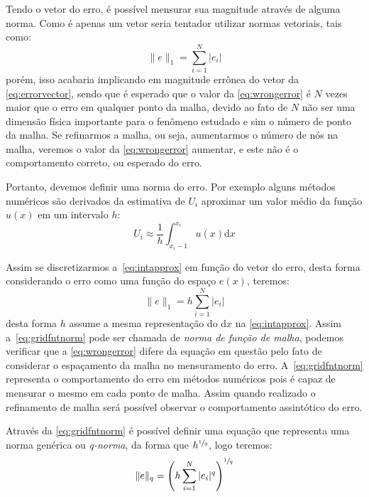 \documentclass[
	12pt,				  %
	openright,		%
	twoside,			%
	a4paper,			%
	chapter=TITLE,		    %
	english,			%
	brazil				%
	]{abntex2}
\begin{document}
Tendo o vetor do erro, é possível mensurar sua magnitude através
de alguma norma. Como é apenas um vetor seria tentador utilizar normas
vetoriais, tais como:
\begin{equation}
    \|e\|_1 = \sum_{i=1}^N |e_i|
    \label{eq:wrongerror}
\end{equation}
porém, isso acabaria implicando em magnitude errônea do vetor da
\autoref{eq:errorvector}, sendo que é esperado que o valor da
\autoref{eq:wrongerror} é $N$ vezes maior que o erro em qualquer ponto da
malha, devido ao fato de $N$ não ser uma dimensão física importante para o
fenômeno estudado e sim o número de ponto da malha. Se refinarmos a malha, ou
seja, aumentarmos o número de nós na malha, veremos o valor da
\autoref{eq:wrongerror} aumentar, e este não é o comportamento correto, ou
esperado do erro. 

Portanto, devemos definir uma norma do erro. Por exemplo alguns métodos
numéricos são derivados da estimativa de $U_i$ aproximar um valor médio da função
$u(x)$ em um intervalo $h$:
\begin{equation}
    U_i \approx \frac{1}{h}\int_{x_i-1}^{x_i} u(x)\mathrm{d}x
    \label{eq:intapprox}
\end{equation}

Assim se discretizarmos a~\autoref{eq:intapprox} em função do vetor do erro,
desta forma considerando o erro como uma função do espaço $e(x)$, teremos:
\begin{equation}
    \|e\|_1 = h\sum_{i=1}^N |e_i|
    \label{eq:gridfntnorm}
\end{equation}
desta forma $h$ assume a mesma representação do $\mathrm{d}x$ na
\autoref{eq:intapprox}. Assim a~\autoref{eq:gridfntnorm} pode ser chamada de
\textit{norma de função de malha}, podemos verificar que a
\autoref{eq:wrongerror} difere da equação em questão pelo fato de considerar o
espaçamento da malha no mensuramento do erro. A~\autoref{eq:gridfntnorm}
representa o comportamento do erro em métodos numéricos pois é capaz de
mensurar o mesmo em cada ponto de malha. Assim quando realizado o refinamento de
malha será possível observar o comportamento assintótico do erro.

Através da \autoref{eq:gridfntnorm} é possível definir uma equação que
representa uma norma genérica ou \textit{q-norma}, da forma que
$h^{\sfrac{1}{q}}$, logo teremos:
\begin{equation}
    \|e\|_q = {\left( h\sum_{i=1}^{N} |e_i|^q \right)}^{\sfrac{1}{q}}
    \label{eq:genericnorm}
\end{equation}
\end{document}
